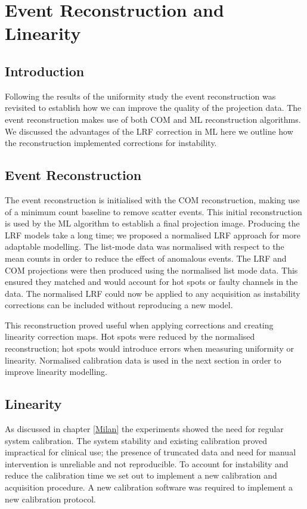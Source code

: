 \chapter{Event Reconstruction and Linearity}
\label{Linearity}

\section{Introduction}
Following the results of the uniformity study the event reconstruction was revisited to  establish how we can improve the quality of the projection data. The event reconstruction makes use of both \acrshort{COM} and \acrshort{ML} reconstruction algorithms. We discussed the advantages of the \acrshort{LRF} correction in \acrshort{ML} here we outline how the reconstruction implemented corrections for instability. 

\section{Event Reconstruction}
The event reconstruction is initialised with the \acrshort{COM} reconstruction, making use of a minimum count baseline to remove scatter events. This initial reconstruction is used by the \acrshort{ML} algorithm to establish a final projection image. Producing the \acrshort{LRF} models take a long time; we proposed a normalised \acrshort{LRF} approach for more adaptable modelling. The list-mode data was normalised with respect to the mean counts in order to reduce the effect of anomalous events. The \acrshort{LRF} and \acrshort{COM} projections were then produced using the normalised list mode data. This ensured they matched and would account for hot spots or faulty channels in the data. The normalised \acrshort{LRF} could now be applied to any acquisition as instability corrections can be included without reproducing a new model. 

This reconstruction proved useful when applying corrections and creating linearity correction maps. Hot spots were reduced by the normalised reconstruction; hot spots would introduce errors when measuring uniformity or linearity. Normalised calibration data is used in the next section in order to improve linearity modelling.

\section{Linearity}
As discussed in chapter \ref{Milan} the experiments showed the need for regular system calibration. The system stability and existing calibration proved impractical for clinical use; the presence of truncated data and need for manual intervention is unreliable and not reproducible. To account for instability and reduce the calibration time we set out to implement a new calibration and acquisition procedure. A new calibration software was required to implement a new calibration protocol.

